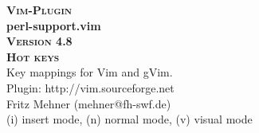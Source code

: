 \documentclass[oneside,10pt,landscape,DIV17]{scrartcl}
\newcommand{\Pluginversion}{4.8}
\begin{document}
%

\begin{multicols}{3}
%
\begin{center}
%
\textbf{\textsc{\small{Vim-Plugin}}}\\
\textbf{\LARGE{perl-support.vim}}\\
\textbf{\textsc{\small{Version \Pluginversion}}}\\
\vspace{5mm}%
\textbf{\textsc{\Huge{Hot keys}}}\\ 
\vspace{5mm}%
Key mappings for Vim and gVim.\\
Plugin: http://vim.sourceforge.net\\
Fritz Mehner (mehner@fh-swf.de)\\
\vspace{1.0mm}
{\normalsize (i)} insert mode, {\normalsize (n)} normal mode, {\normalsize (v)} visual mode\\
\vspace{4.0mm}


\end{center}
\end{multicols}
\end{document}
